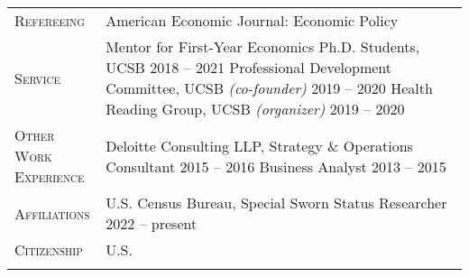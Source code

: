 \documentclass[11pt]{article}
\newcommand{\xspace}{19pt}
\begin{document}
\begin{tabularx}{\textwidth}{@{}Y Z@{}}
	\textsc{Refereeing}  & 
	American Economic Journal: Economic Policy
	 \\ \addlinespace[\xspace] 
	
	\textsc{Service} & 
	Mentor for First-Year Economics Ph.D. Students, UCSB \hfill 2018 -- 2021%
	\vspace{3pt} \newline
	Professional Development Committee, UCSB \textit{(co-founder)}  \hfill 2019 -- 2020%
	\vspace{3pt} \newline
	Health Reading Group, UCSB \textit{(organizer)} \hfill 2019 -- 2020%
	\\ \addlinespace[\xspace] 
	

	\textsc{Other Work \newline Experience}  & 
	Deloitte Consulting LLP, Strategy \& Operations
	\vspace{3pt} \newline
	Consultant \hfill 2015 -- 2016%
	\vspace{3pt} \newline
	Business Analyst \hfill 2013 -- 2015%
	\\ \addlinespace[\xspace] 
	
	\textsc{Affiliations}  & 
	U.S. Census Bureau, Special Sworn Status Researcher \hfill 2022 -- present%
	\\ \addlinespace[\xspace] 
	
	\textsc{Citizenship} & 
	U.S.
	\\ \addlinespace[\xspace] 
	

\end{tabularx}
\end{document}
